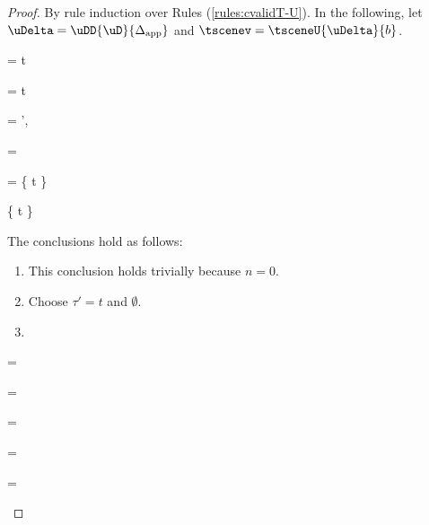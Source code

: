 \begin{proof}
By rule induction over Rules (\ref{rules:cvalidT-U}). In the following, let $\uDelta = \uDD{\uD}{\Delta_\text{app}}$ and $\tscenev=\tsceneU{\uDelta}{b}$.
\begin{byCases}
  \item[\text{(\ref{rule:cvalidT-U-tvar})}] 
    \begin{pfsteps}
    \item \ctau = t 
    \item \tau = t 
    \item \Delta = \Delta',   
    \item \segof{\ctau} = \emptyset {}
    \item {} = \{ t \}  
    \item \{ t \} \subset \domof{\Delta} \cup \emptyset {} 
    \end{pfsteps}
    The conclusions hold as follows:
    \begin{enumerate}
    \item This conclusion holds trivially because $n=0$.
    \item Choose $\tau'=t$ and $\emptyset$.
    \item {}
    \end{enumerate}
    \resetpfcounter
  \item[\text{(\ref{rule:cvalidT-U-parr})}] 
    \begin{pfsteps}
    \item \ctau =  
    \item \tau =  
    \item {}  
    \item {}  
    \item \segof{\ctau} =  \cup {}  
    \item {} =   
    \item {} =   

\end{pfsteps}
\end{byCases}
\end{proof}
